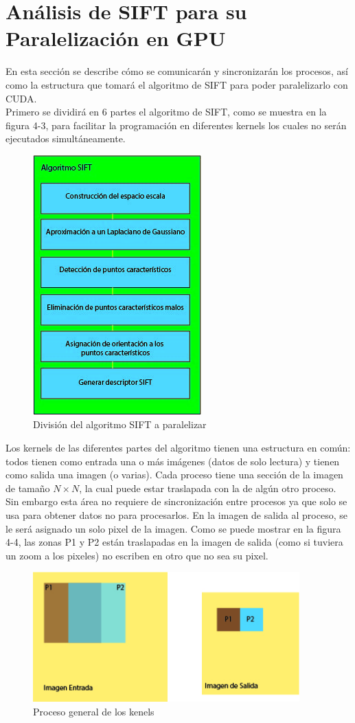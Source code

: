 \section{Análisis de SIFT para su Paralelización en GPU}
En esta sección se describe cómo se comunicarán y sincronizarán los procesos, así como la estructura que tomará el algoritmo de SIFT para poder paralelizarlo con CUDA.\\
Primero se dividirá en 6 partes el algoritmo de SIFT, como se muestra en la figura 4-3, para facilitar la programación en diferentes kernels los cuales no serán ejecutados simultáneamente.\\
\begin{figure}[H]
			\centering
				\includegraphics[height=10cm]{img/SIFTdiv.jpg}
			\caption{División del algoritmo SIFT a paralelizar}
\end{figure}
Los kernels de las diferentes partes del algoritmo tienen una estructura en común: todos tienen como entrada una o más imágenes (datos de solo lectura) y tienen como salida una imagen (o varias). Cada proceso tiene una sección de la imagen de tamaño  $N \times N$, la cual puede estar traslapada con la de algún otro proceso. Sin embargo esta área no requiere de sincronización entre procesos ya que solo se usa para obtener datos no para procesarlos. En la imagen de salida al proceso, se le será asignado un solo pixel de la imagen. Como se puede mostrar en la figura 4-4, las zonas P1 y P2 están traslapadas en la imagen de salida (como si tuviera un zoom a los pixeles) no escriben en otro que no sea su pixel.
\begin{figure}[H]
			\centering
				\includegraphics[height=5cm]{img/prosImg.jpg}
			\caption{Proceso general de los kenels}
\end{figure}
